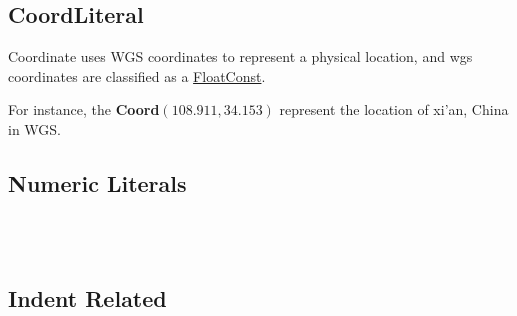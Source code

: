 \subsection{CoordLiteral} \label{CoordLiteral}
Coordinate uses WGS coordinates to represent a physical location, and wgs coordinates are classified as a \hyperref[FloatConst]{FloatConst}.
\begin{grammar}
\end{grammar}
For instance, the \textbf{Coord}$(108.911, 34.153)$ represent the location of  xi'an, China in WGS.

\subsection{Numeric Literals}\label{FloatConst}\label{IntConst}
\begin{grammar}
    \\
    \\
\end{grammar}

\subsection{Indent Related}\label{NEWLINE}\label{INDENT}\label{DEDENT}


